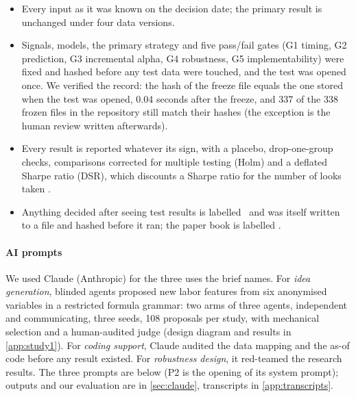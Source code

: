 \begin{table}[!htbp]
\centering\footnotesize
\caption{Turnover and costs in the test window. Break-even is the industry cost at which net return is zero. \hfill\tagc\ (A3) / \tagp} %
\label{tab:costs}
\fit{}
\end{table}

\begin{keybox}
\begin{itemize}[leftmargin=*]
  \item Every input as it was known on the decision date; the primary result is unchanged under four data versions. %
  \item Signals, models, the primary strategy and five pass/fail gates (G1 timing, G2 prediction, G3 incremental alpha, G4 robustness, G5 implementability) were fixed and hashed before any test data were touched, and the test was opened once. We verified the record: the hash of the freeze file equals the one stored when the test was opened, 0.04 seconds after the freeze, and 337 of the 338 frozen files in the repository still match their hashes (the exception is the human review written afterwards). %
  \item Every result is reported whatever its sign, with a placebo, drop-one-group checks, comparisons corrected for multiple testing (Holm) and a deflated Sharpe ratio (DSR), which discounts a Sharpe ratio for the number of looks taken \citep{BaileyLopezdePrado2014}.
  \item Anything decided after seeing test results is labelled \tagp\ and was itself written to a file and hashed before it ran; the paper book is labelled \tagf.
\end{itemize}
\end{keybox}

\paragraph{AI prompts}\label{sec:ai} We used Claude (Anthropic) for the three uses the brief names. For \emph{idea generation}, blinded agents proposed new labor features from six anonymised variables in a restricted formula grammar: two arms of three agents, independent and communicating, three seeds, 108 proposals per study, with mechanical selection and a human-audited judge (design diagram and results in \cref{app:study1}). %
For \emph{coding support}, Claude audited the data mapping and the as-of code before any result existed. For \emph{robustness design}, it red-teamed the research results. The three prompts are below (P2 is the opening of its system prompt); outputs and our evaluation are in \cref{sec:claude}, transcripts in \cref{app:transcripts}.

